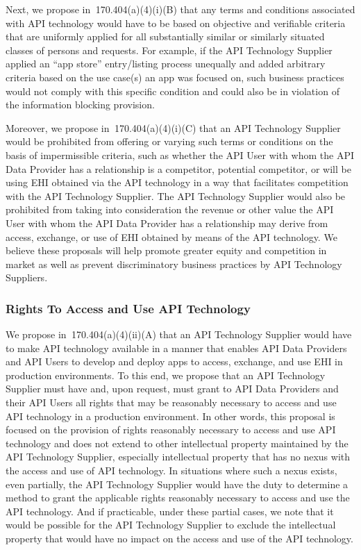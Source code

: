 \documentclass[twoside,11pt]{article}
\begin{document}
          Next, we propose in \textsection{} 170.404(a)(4)(i)(B) that any terms and conditions associated with API technology would have to be based on objective and verifiable criteria that are uniformly applied for all substantially similar or similarly situated classes of persons and requests. For example, if the API Technology Supplier applied an “app store” entry/listing process unequally and added arbitrary criteria based on the use case(s) an app was focused on, such business practices would not comply with this specific condition and could also be in violation of the information blocking provision.



          Moreover, we propose in \textsection{} 170.404(a)(4)(i)(C) that an API Technology Supplier would be prohibited from offering or varying such terms or conditions on the basis of impermissible criteria, such as whether the API User with whom the API Data Provider has a relationship is a competitor, potential competitor, or will be using EHI obtained via the API technology in a way that facilitates competition with the API Technology Supplier. The API Technology Supplier would also be prohibited from taking into consideration the revenue or other value the API User with whom the API Data Provider has a relationship may derive from access, exchange, or use of EHI obtained by means of the API technology. We believe these proposals  \ifhmode\expandafter\xspace\fi will help promote greater equity and competition in market as well as prevent discriminatory business practices by API Technology Suppliers.


          \subsubsection{Rights To Access and Use API Technology}

          We propose in \textsection{} 170.404(a)(4)(ii)(A) that an API Technology Supplier would have to make API technology available in a manner that enables API Data Providers and API Users to develop and deploy apps to access, exchange, and use EHI in production environments. To this end, we propose that an API Technology Supplier must have and, upon request, must grant to API Data Providers and their API Users all rights that may be reasonably necessary to access and use API technology in a production environment. In other words, this proposal is focused on the provision of rights reasonably necessary to access and use API technology and does not extend to other intellectual property maintained by the API Technology Supplier, especially intellectual property that has no nexus with the access and use of API technology. In situations where such a nexus exists, even partially, the API Technology Supplier would have the duty to determine a method to grant the applicable rights reasonably necessary to access and use the API technology. And if practicable, under these partial cases, we note that it would be possible for the API Technology Supplier to exclude the intellectual property that would have no impact on the access and use of the API technology.
\end{document}
